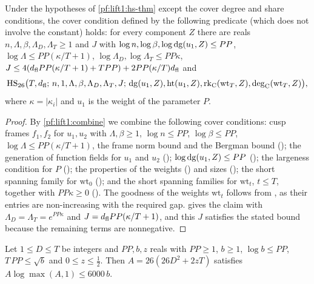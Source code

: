 \begin{proposition}\label{pf:lift1:degpar}
Under the hypotheses of \cref{pf:lift1:hs-thm} except the cover degree and share conditions, the cover
condition defined by the following predicate (which does not involve the constant) holds: for every component $Z$ there
are reals $n,\Lambda,\beta,\Lambda_D,\Lambda_T\ge1$ and $J$ with
$\log n,\log\beta,\log\mathrm{dg}(u_1,Z)\le PP$, $\log\Lambda\le PP(\kappa/T+1)$,
$\log\Lambda_D,\log\Lambda_T\le PP\kappa$,
$J\le4(d_{\mathrm{fl}} PP(\kappa/T+1)+TPP)+2PP(\kappa/T)d_{\mathrm{fl}}$ and
\[
\mathrm{HS}_{26}\bigl(T,d_{\mathrm{fl}};\,n,1,\Lambda,\beta,\Lambda_D,\Lambda_T,J;\,\mathrm{dg}(u_1,Z),
\mathrm{ht}(u_1,Z),\mathrm{rk}_{\mathrm{C}}(\mathrm{wt}_T,Z),\mathrm{deg}_{\mathrm{C}}(\mathrm{wt}_T,Z)\bigr),
\]
where $\kappa=|\kappa_i|$ and $u_1$ is the weight of the parameter $P$.
\end{proposition}

\begin{proof}
By \cref{pf:lift1:combine} we combine the following cover conditions: cusp frames $f_1,f_2$ for $u_1,u_2$
with $\Lambda,\beta\ge1$, $\log n\le PP$, $\log\beta\le PP$, $\log\Lambda\le PP(\kappa/T+1)$, the frame norm
bound and the Bergman bound (); the
generation of function fields for $u_1$ and $u_2$
(); $\log\mathrm{dg}(u_1,Z)\le PP$
(); the largeness condition for $P$
(); the properties of the weights
() and sizes
(); the short spanning family for
$\mathrm{wt}_0$ (); and the short spanning
families for $\mathrm{wt}_t$, $t\le T$, together with $PP\kappa\ge0$
(). The goodness of the weights $\mathrm{wt}_t$
follows from , as their entries are
non-increasing with the required gap.  gives the claim with
$\Lambda_D=\Lambda_T=e^{PP\kappa}$ and $J=d_{\mathrm{fl}} PP(\kappa/T+1)$, and this $J$ satisfies the stated
bound because the remaining terms are nonnegative.
\end{proof}

\begin{lemma}\label{pf:lift1:alog}
Let $1\le D\le T$ be integers and $PP,b,z$ reals with $PP\ge1$, $b\ge1$, $\log b\le PP$,
$T\,PP\le\sqrt b$ and $0\le z\le\frac12$. Then $A=26(26D^2+2zT)$ satisfies $A\log\max(A,1)\le6000\,b$.
\end{lemma}

